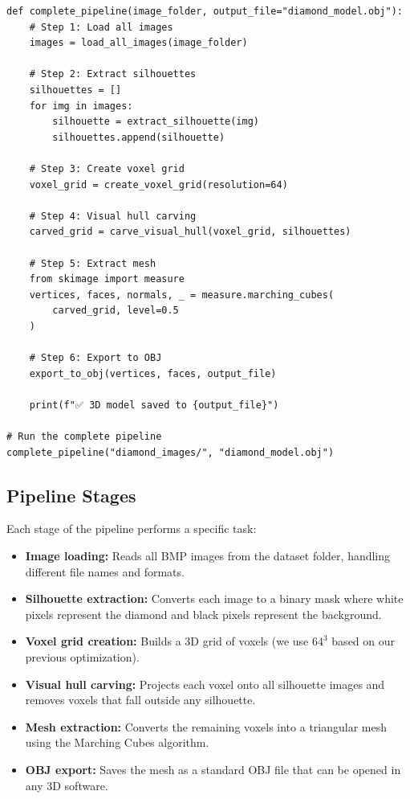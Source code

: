 \documentclass[a4paper,12pt]{article}
\begin{document}
\begin{verbatim}
def complete_pipeline(image_folder, output_file="diamond_model.obj"):
    # Step 1: Load all images
    images = load_all_images(image_folder)
    
    # Step 2: Extract silhouettes
    silhouettes = []
    for img in images:
        silhouette = extract_silhouette(img)
        silhouettes.append(silhouette)
    
    # Step 3: Create voxel grid
    voxel_grid = create_voxel_grid(resolution=64)
    
    # Step 4: Visual hull carving
    carved_grid = carve_visual_hull(voxel_grid, silhouettes)
    
    # Step 5: Extract mesh
    from skimage import measure
    vertices, faces, normals, _ = measure.marching_cubes(
        carved_grid, level=0.5
    )
    
    # Step 6: Export to OBJ
    export_to_obj(vertices, faces, output_file)
    
    print(f"✅ 3D model saved to {output_file}")

# Run the complete pipeline
complete_pipeline("diamond_images/", "diamond_model.obj")
\end{verbatim}

\subsection{Pipeline Stages}

Each stage of the pipeline performs a specific task:

\begin{itemize}
    \item \textbf{Image loading:} Reads all BMP images from the dataset folder, handling different file names and formats.
    \item \textbf{Silhouette extraction:} Converts each image to a binary mask where white pixels represent the diamond and black pixels represent the background.
    \item \textbf{Voxel grid creation:} Builds a 3D grid of voxels (we use $64^3$ based on our previous optimization).
    \item \textbf{Visual hull carving:} Projects each voxel onto all silhouette images and removes voxels that fall outside any silhouette.
    \item \textbf{Mesh extraction:} Converts the remaining voxels into a triangular mesh using the Marching Cubes algorithm.
    \item \textbf{OBJ export:} Saves the mesh as a standard OBJ file that can be opened in any 3D software.
\end{itemize}
\end{document}
